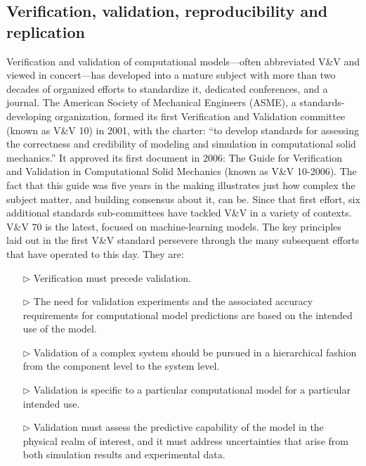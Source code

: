 
\subsection{Verification, validation, reproducibility and replication}

Verification and validation of computational models---often abbreviated V\&V and viewed in concert---has developed into a mature subject with more than two decades of organized efforts to standardize it, dedicated conferences, and a  journal. 
The American Society of Mechanical Engineers (ASME), a standards-developing organization, formed its first Verification and Validation committee (known as V\&V 10) in 2001, with the charter: 
``to develop standards for assessing the correctness and credibility of modeling and simulation in computational solid mechanics.''
It approved its first document in 2006: The Guide for Verification and Validation in Computational Solid Mechanics (known as V\&V 10-2006). 
The fact that this guide was five years in the making illustrates just how complex the subject matter, and building consensus about it, can be. 
Since that first effort, six additional standards sub-committees have tackled V\&V in a variety of contexts. 
V\&V 70 is the latest, focused on machine-learning models.
The key principles laid out in the first V\&V standard persevere through the many subsequent efforts that have operated to this day. 
They are:

\begin{enumerate}

\item[$\triangleright$] Verification must precede validation.
\item[$\triangleright$] The need for validation experiments and the associated accuracy requirements for computational model predictions are based on the intended use of the model.
\item[$\triangleright$] Validation of a complex system should be pursued in a hierarchical fashion from the component level to the system level.
\item[$\triangleright$] Validation is specific to a particular computational model for a particular intended use.
\item[$\triangleright$] Validation must assess the predictive capability of the model in the physical realm of interest, and it
must address uncertainties that arise from both simulation results and experimental data.

\end{enumerate}

